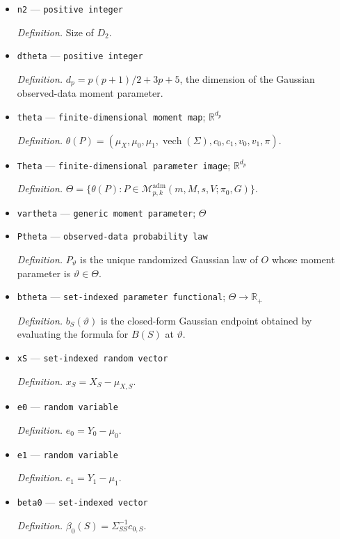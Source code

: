 \documentclass{article}
\begin{document}
\begin{itemize}
  \item \texttt{n2} --- \texttt{positive integer}
  \par\smallskip\noindent\emph{Definition.} Size of \(D_2\).
  \item \texttt{dtheta} --- \texttt{positive integer}
  \par\smallskip\noindent\emph{Definition.} \(d_p=p(p+1)/2+3p+5\), the dimension of the Gaussian observed-data moment parameter.
  \item \texttt{theta} --- \texttt{finite-\allowbreak{}dimensional moment map}; \(\mathbb R^{d_p}\)
  \par\smallskip\noindent\emph{Definition.} \(\theta(P)=(\mu_X,\mu_0,\mu_1,\operatorname{vech}(\Sigma),c_0,c_1,v_0,v_1,\pi)\).
  \item \texttt{Theta} --- \texttt{finite-\allowbreak{}dimensional parameter image}; \(\mathbb R^{d_p}\)
  \par\smallskip\noindent\emph{Definition.} \(\Theta=\{\theta(P):P\in\mathcal M^{\mathrm{adm}}_{p,k}(m,M,s,V;\pi_0,G)\}\).
  \item \texttt{vartheta} --- \texttt{generic moment parameter}; \(\Theta\)
  \item \texttt{Ptheta} --- \texttt{observed-\allowbreak{}data probability law}
  \par\smallskip\noindent\emph{Definition.} \(P_{\vartheta}\) is the unique randomized Gaussian law of \(O\) whose moment parameter is \(\vartheta\in\Theta\).
  \item \texttt{btheta} --- \texttt{set-\allowbreak{}indexed parameter functional}; \(\Theta\to\mathbb R_+\)
  \par\smallskip\noindent\emph{Definition.} \(b_S(\vartheta)\) is the closed-form Gaussian endpoint obtained by evaluating the formula for \(B(S)\) at \(\vartheta\).
  \item \texttt{xS} --- \texttt{set-\allowbreak{}indexed random vector}
  \par\smallskip\noindent\emph{Definition.} \(x_S=X_S-\mu_{X,S}\).
  \item \texttt{e0} --- \texttt{random variable}
  \par\smallskip\noindent\emph{Definition.} \(e_0=Y_0-\mu_0\).
  \item \texttt{e1} --- \texttt{random variable}
  \par\smallskip\noindent\emph{Definition.} \(e_1=Y_1-\mu_1\).
  \item \texttt{beta0} --- \texttt{set-\allowbreak{}indexed vector}
  \par\smallskip\noindent\emph{Definition.} \(\beta_0(S)=\Sigma_{SS}^{-1}c_{0,S}\).

\end{itemize}
\end{document}
